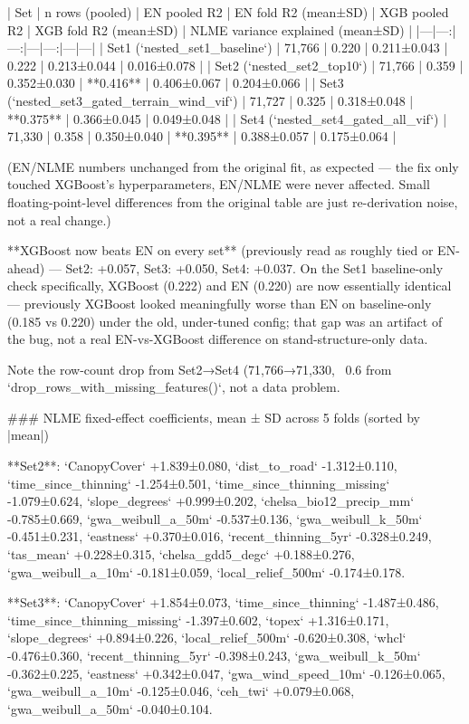 | Set | n rows (pooled) | EN pooled R2 | EN fold R2 (mean±SD) | XGB pooled R2 | XGB fold R2 (mean±SD) | NLME variance explained (mean±SD) |
|---|---:|---:|---|---:|---|---|
| Set1 (`nested_set1_baseline`) | 71,766 | 0.220 | 0.211±0.043 | 0.222 | 0.213±0.044 | 0.016±0.078 |
| Set2 (`nested_set2_top10`) | 71,766 | 0.359 | 0.352±0.030 | **0.416** | 0.406±0.067 | 0.204±0.066 |
| Set3 (`nested_set3_gated_terrain_wind_vif`) | 71,727 | 0.325 | 0.318±0.048 | **0.375** | 0.366±0.045 | 0.049±0.048 |
| Set4 (`nested_set4_gated_all_vif`) | 71,330 | 0.358 | 0.350±0.040 | **0.395** | 0.388±0.057 | 0.175±0.064 |

(EN/NLME numbers unchanged from the original fit, as expected — the fix only touched XGBoost's
hyperparameters, EN/NLME were never affected. Small floating-point-level differences from the
original table are just re-derivation noise, not a real change.)

**XGBoost now beats EN on every set** (previously read as roughly tied or EN-ahead) — Set2:
+0.057, Set3: +0.050, Set4: +0.037. On the Set1 baseline-only check specifically, XGBoost
(0.222) and EN (0.220) are now essentially identical — previously XGBoost looked meaningfully
worse than EN on baseline-only (0.185 vs 0.220) under the old, under-tuned config; that gap was
an artifact of the bug, not a real EN-vs-XGBoost difference on stand-structure-only data.

Note the row-count drop from Set2→Set4 (71,766→71,330, ~0.6%
from `drop_rows_with_missing_features()`, not a data problem.

### NLME fixed-effect coefficients, mean ± SD across 5 folds (sorted by |mean|)

**Set2**: `CanopyCover` +1.839±0.080, `dist_to_road` -1.312±0.110, `time_since_thinning`
-1.254±0.501, `time_since_thinning_missing` -1.079±0.624, `slope_degrees` +0.999±0.202,
`chelsa_bio12_precip_mm` -0.785±0.669, `gwa_weibull_a_50m` -0.537±0.136, `gwa_weibull_k_50m`
-0.451±0.231, `eastness` +0.370±0.016, `recent_thinning_5yr` -0.328±0.249, `tas_mean`
+0.228±0.315, `chelsa_gdd5_degc` +0.188±0.276, `gwa_weibull_a_10m` -0.181±0.059,
`local_relief_500m` -0.174±0.178.

**Set3**: `CanopyCover` +1.854±0.073, `time_since_thinning` -1.487±0.486,
`time_since_thinning_missing` -1.397±0.602, `topex` +1.316±0.171, `slope_degrees` +0.894±0.226,
`local_relief_500m` -0.620±0.308, `whcl` -0.476±0.360, `recent_thinning_5yr` -0.398±0.243,
`gwa_weibull_k_50m` -0.362±0.225, `eastness` +0.342±0.047, `gwa_wind_speed_10m` -0.126±0.065,
`gwa_weibull_a_10m` -0.125±0.046, `ceh_twi` +0.079±0.068, `gwa_weibull_a_50m` -0.040±0.104.

